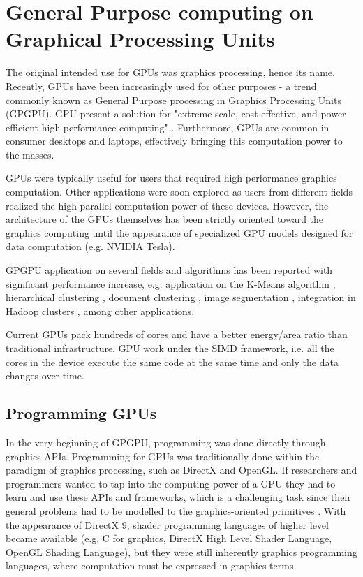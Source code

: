 \chapter{General Purpose computing on Graphical Processing Units}
\label{sec:gpgpu}

The original intended use for GPUs was graphics processing, hence its name.
Recently, GPUs have been increasingly used for other purposes - a trend commonly known as General Purpose processing in Graphics Processing Units (GPGPU).
GPU present a solution for "extreme-scale, cost-effective, and power-efficient high performance computing" \cite{Chen2012}.
Furthermore, GPUs are common in consumer desktops and laptops, effectively bringing this computation power to the masses.

GPUs were typically useful for users that required high performance graphics computation.
Other applications were soon explored as users from different fields realized the high parallel computation power of these devices.
However, the architecture of the GPUs themselves has been strictly oriented toward the graphics computing until the appearance of specialized GPU models designed for data computation (e.g. NVIDIA Tesla).

GPGPU application on several fields and algorithms has been reported with significant performance increase, e.g. application on the K-Means algorithm \cite{Bai2009,Wu2011,Zechner2009,Wu2009a}, hierarchical clustering \cite{Shalom2009,ArulShalom2011}, document clustering \cite{gao20xx}, image segmentation \cite{Sirotkovi2012}, integration in Hadoop clusters \cite{Malakar2013,Grossman2013}, among other applications.

Current GPUs pack hundreds of cores and have a better energy/area ratio than traditional infrastructure.
GPU work under the SIMD framework, i.e. all the cores in the device execute the same code at the same time and only the data changes over time.

\section{Programming GPUs}

In the very beginning of GPGPU, programming was done directly through graphics APIs.
Programming for GPUs was traditionally done within the paradigm of graphics processing, such as DirectX and OpenGL.
If researchers and programmers wanted to tap into the computing power of a GPU they had to learn and use these APIs and frameworks, which is a challenging task since their general problems had to be modelled to the graphics-oriented primitives \cite{Misi2012}.
With the appearance of DirectX 9, shader programming languages of higher level became available (e.g. C for graphics, DirectX High Level Shader Language, OpenGL Shading Language), but they were still inherently graphics programming languages, where computation must be expressed in graphics terms. 

